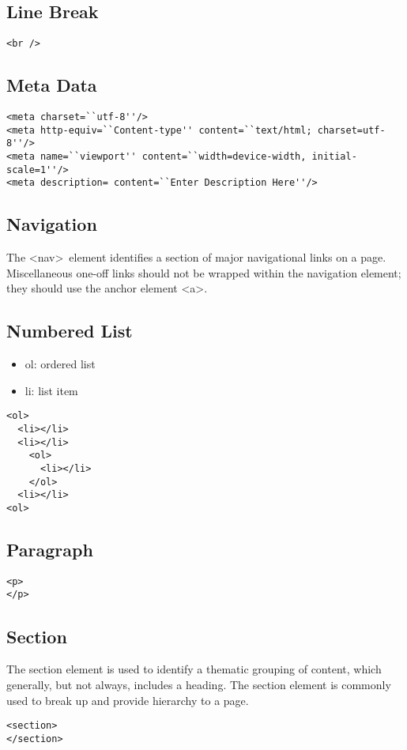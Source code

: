 \documentclass{article}
\begin{document}
\subsection{Line Break}
\begin{lstlisting}
<br />
\end{lstlisting}

\subsection{Meta Data}
\begin{lstlisting}
<meta charset=``utf-8''/>
<meta http-equiv=``Content-type'' content=``text/html; charset=utf-8''/>
<meta name=``viewport'' content=``width=device-width, initial-scale=1''/>
<meta description= content=``Enter Description Here''/>
\end{lstlisting}

\subsection{Navigation}
The \textless nav\textgreater \ element identifies a section of major
navigational links on a page. Miscellaneous one-off links should not be wrapped
within the navigation element; they should use the anchor element
\textless a\textgreater.

\subsection{Numbered List}
\begin{itemize}
  \item ol: ordered list
  \item li: list item
\end{itemize}

\begin{lstlisting}
<ol>
  <li></li>
  <li></li>
    <ol>
      <li></li>
    </ol>
  <li></li>
<ol>
\end{lstlisting}

\subsection{Paragraph}
\begin{lstlisting}
<p>
</p>
\end{lstlisting}

\subsection{Section}
The section element is used to identify a thematic grouping of content, which
generally, but not always, includes a heading. The section element is commonly
used to break up and provide hierarchy to a page.
\begin{lstlisting}
<section>
</section>
\end{lstlisting}
\end{document}
